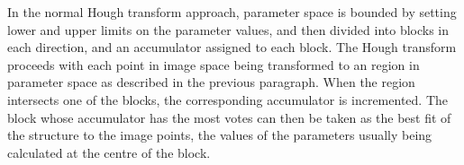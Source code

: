 In the normal Hough transform approach, parameter space is bounded by
setting lower and upper limits on the parameter values, and then divided
into blocks in each direction, and an accumulator assigned
to each block. The Hough transform proceeds with each point in image space
being transformed to an region in parameter space as described in the
previous paragraph. When the region intersects one of the blocks,
the corresponding accumulator is incremented. The block whose
accumulator has the most
votes can then be taken as the best fit of the structure to the image
points, the values of the parameters usually being calculated at the
centre of the block.

